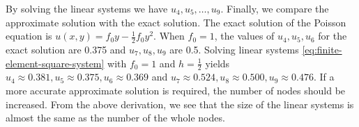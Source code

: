 {By solving the linear systems we have $u_4,u_5,\ldots,u_9$.}
{Finally, we compare the approximate solution with the exact solution. The exact solution of the Poisson equation is $u(x,y)=f_0y-\frac12f_0y^2$. When $f_0=1$, the values of $u_4,u_5,u_6$ for the exact solution are 0.375 and $u_7,u_8,u_9$ are 0.5. Solving linear systems \eqref{eq:finite-element-square-system} with $f_0=1$ and $h=\frac12$ yields $u_4\approx0.381,u_5\approx0.375,u_6\approx0.369$ and $u_7\approx0.524,u_8\approx0.500,u_9\approx0.476$.}
{If a more accurate approximate solution is required, the number of nodes should be increased. From the above derivation, we see that the size of the linear systems is almost the same as the number of the whole nodes.}
